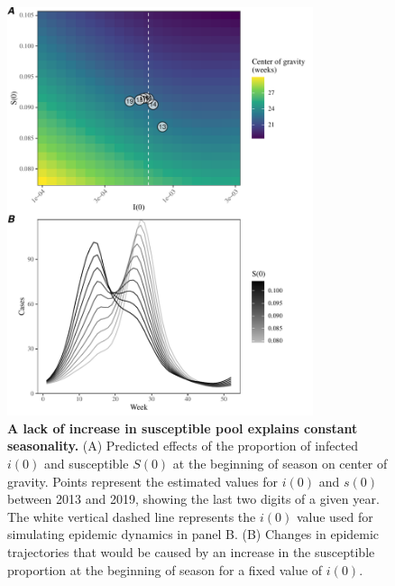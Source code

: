 \documentclass[12pt]{article}
\begin{document}
\begin{figure}[!th]
\begin{center}
\includegraphics[width=0.8\textwidth]{../figure/figure_ryukyu_sirs_change.pdf}
\caption{
\textbf{A lack of increase in susceptible pool explains constant seasonality.}
(A) Predicted effects of the proportion of infected $i(0)$ and susceptible $S(0)$ at the beginning of season on center of gravity.
Points represent the estimated values for $i(0)$ and $s(0)$ between 2013 and 2019, showing the last two digits of a given year.
The white vertical dashed line represents the $i(0)$ value used for simulating epidemic dynamics in panel B.
(B) Changes in epidemic trajectories that would be caused by an increase in the susceptible proportion at the beginning of season for a fixed value of $i(0)$.
}
\end{center}
\end{figure}

\pagebreak


\end{document}
